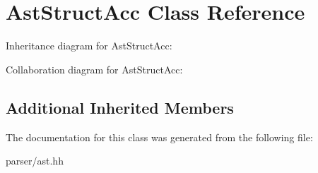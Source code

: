 \hypertarget{classAstStructAcc}{}\section{Ast\+Struct\+Acc Class Reference}
\label{classAstStructAcc}


Inheritance diagram for Ast\+Struct\+Acc\+:


Collaboration diagram for Ast\+Struct\+Acc\+:
\subsection*{Additional Inherited Members}


The documentation for this class was generated from the following file\+:\begin{DoxyCompactItemize}
\item 
parser/ast.\+hh\end{DoxyCompactItemize}
